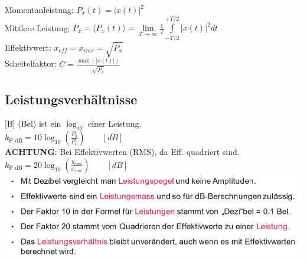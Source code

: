 \noindent Momentanleistung: $P_x(t) = \left|x(t)\right|^2$\\
Mittlere Leistung: $\overline{P}_x =  \langle P_x(t) \rangle = \lim\limits_{T\rightarrow\infty}\frac{1}{T}\int\limits_{-T/2}^{+T/2}\left|x(t)\right|^2dt$ \\
Effektivwert: $x_{eff} = x_{rms} = \sqrt{\overline{P}_x}$ \\
Scheitelfaktor: $C = \frac{\max(\left|x(t)\right|)}{\sqrt{\overline{P}_x}}$

\subsection{Leistungsverhältnisse}
[B] (Bel) ist ein $\log_{10}$ einer Leistung.\\
$k_{\text{P dB}} = 10 \log_{10}(\frac{P_y}{P_x}) \qquad [dB]$ \\

\textbf{ACHTUNG}: Bei Effektivwerten (RMS), da Eff. quadriert sind.\\ $k_{\text{P dB}} = 20 \log_{10}(\frac{y_{rms}}{x_{rms}}) \qquad [dB]$\\
\includegraphics[width=\columnwidth]{Images/screenshot001}
